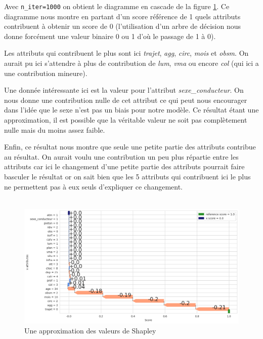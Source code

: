\documentclass{article}
\begin{document}
    Avec \texttt{n\_iter=1000} on obtient le diagramme en cascade de la figure \ref{fig:fig_shap}. Ce diagramme 
    nous montre en partant d'un score référence de 1 quels attributs contribuent à obtenir un score de 0 (l'utilisation 
    d'un arbre de décision nous donne forcément une valeur binaire 0 ou 1 d'où le passage de 1 à 0).

    Les attributs qui contribuent le plus sont ici \textit{trajet}, \textit{agg}, \textit{circ}, \textit{mois} et 
    \textit{obsm}. On aurait pu ici s'attendre à plus de contribution de \textit{lum}, \textit{vma} ou 
    encore \textit{col} (qui ici a une contribution mineure).

    Une donnée intéressante ici est la valeur pour l'attribut \textit{sexe\_conducteur}. On nous donne une contribution 
    nulle de cet attribut ce qui peut nous encourager dans l'idée que le sexe n'est pas un biais pour notre modèle. 
    Ce résultat étant une approximation, il est possible que la véritable valeur ne soit pas complètement nulle mais 
    du moins assez faible.

    Enfin, ce résultat nous montre que seule une petite partie des attributs contribue au résultat. On aurait 
    voulu une contribution un peu plus répartie entre les attributs car ici le changement d'une petite partie
     des attributs pourrait faire basculer le résultat or on sait bien que les 5 attributs qui contribuent ici le 
     plus ne permettent pas à eux seuls d'expliquer ce changement. \\\\

    \begin{figure}[h]
        \centering
        \includegraphics[width=\textwidth]{./img/shap1.png}
        \caption{Une approximation des valeurs de Shapley}
        \label{fig:fig_shap}
    \end{figure}
\end{document}
